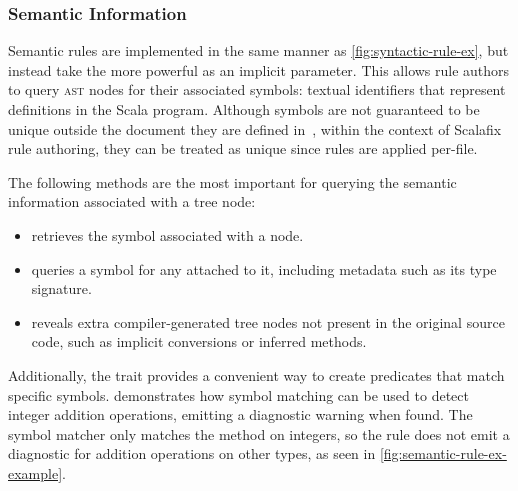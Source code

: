 \documentclass[../../main.tex]{subfiles}
\begin{document}
\subsubsection{Semantic Information}
Semantic rules are implemented in the same manner as \cref{fig:syntactic-rule-ex}, but instead take the more powerful  as an implicit parameter.
This allows rule authors to query \textsc{ast} nodes for their associated symbols: textual identifiers that represent definitions in the Scala program.
Although symbols are not guaranteed to be unique outside the document they are defined in~\cite{scalameta_semanticdb_spec_2023}, within the context of Scalafix rule authoring, they can be treated as unique since rules are applied per-file.

The following methods are the most important for querying the semantic information associated with a tree node:
\begin{itemize}
  \item {} retrieves the symbol associated with a node.
  \item {} queries a symbol for any  attached to it, including metadata such as its type signature.
  \item {} reveals extra compiler-generated tree nodes not present in the original source code, such as implicit conversions or inferred  methods.
\end{itemize}

Additionally, the  trait provides a convenient way to create predicates that match specific symbols.
 demonstrates how symbol matching can be used to detect integer addition operations, emitting a diagnostic warning when found.
The  symbol matcher only matches the \scala{+} method on integers, so the rule does not emit a diagnostic for addition operations on other types, as seen in \cref{fig:semantic-rule-ex-example}.

\end{document}
